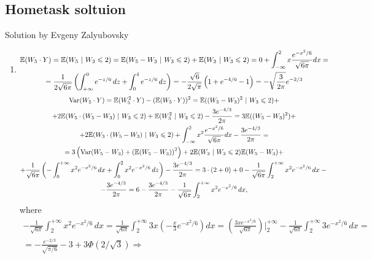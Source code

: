 \documentclass[12pt, a4paper]{article}
\begin{document}
\subsection{Hometask soltuion}

Solution by Evgeny Zalyubovsky

\begin{enumerate}
	\item
\begin{multline*}
	\mathbb{E}(W_5 \cdot Y) = \mathbb{E}(W_5\ |\ W_3 \leqslant 2) = \mathbb{E}(W_5 - W_3\ |\ W_3 \leqslant 2) + \mathbb{E}(W_3\ |\ W_3 \leqslant 2) = 0 + \int_{-\infty}^{2} x\dfrac{e^{-x^2/6}}{\sqrt{6\pi}} dx =\\= \frac{1}{2\sqrt{6\pi}} \left(\int_{+\infty}^{0} e^{-z/6}\,dz + \int_{0}^{4} e^{-z/6}\,dz\right) = -\frac{\sqrt{6}}{2\sqrt{\pi}} \left(1 + e^{-4/6} - 1\right) = -\sqrt{\frac{3}{2\pi}} e^{-2/3}
\end{multline*}
\begin{multline*}
	\operatorname{Var}(W_5 \cdot Y) = \mathbb{E}(W_5^2 \cdot Y) - (\mathbb{E}(W_5 \cdot Y))^2 = \mathbb{E}((W_5 - W_3)^2\ |\ W_3 \leqslant 2) +\\
	+ 2\mathbb{E}(W_5 \cdot (W_5 - W_3)\ |\ W_3 \leqslant 2) + \mathbb{E}(W_3^2\ |\ W_3 \leqslant 2) - \frac{3e^{-4/3}}{2\pi} =
	3\mathbb{E}((W_5 - W_3)^2) +\\
	+ 2\mathbb{E}(W_3 \cdot (W_5 - W_3)\ |\ W_3 \leqslant 2) + \int_{-\infty}^{2} x^2 \frac{e^{-x^2/6}}{\sqrt{6\pi}} dx - \frac{3e^{-4/3}}{2\pi} =\\
	= 3 \left(\operatorname{Var}(W_5 - W_3) + \left(\mathbb{E}(W_5 - W_3)\right)^2\right) + 2 \mathbb{E}(W_3\ |\ W_3 \leqslant 2) \mathbb{E}(W_5 - W_3) +\\
	+ \frac{1}{\sqrt{6\pi}} \left(-\int_{0}^{+\infty} x^2 e^{-x^2/6}\,dx + \int_{0}^{2} x^2 e^{-x^2/6}\,dz\right) - \frac{3e^{-4/3}}{2\pi} = 3 \cdot (2 + 0) + 0 - \frac{1}{\sqrt{6\pi}} \int_{2}^{+\infty} x^2 e^{-x^2/6}\,dx -{}\\
	- \frac{3e^{-4/3}}{2\pi} = 6 - \frac{3e^{-4/3}}{2\pi} - \frac{1}{\sqrt{6\pi}} \int_{2}^{+\infty} x^2 e^{-x^2/6}\,dx,
\end{multline*}
where
\begin{multline*}
-\frac{1}{\sqrt{6\pi}} \int_{2}^{+\infty} x^2 e^{-x^2/6}\,dx = \frac{1}{\sqrt{6\pi}} \int_{2}^{+\infty} 3x \left(-\frac{x}{3} e^{-x^2/6}\right) dx = \left(\frac{3xe^{-x^2/6}}{\sqrt{6\pi}}\right)\bigg|_{2}^{+\infty} - \frac{1}{\sqrt{6\pi}} \int_{2}^{+\infty} 3e^{-x^2/6}\,dx =\\= -\frac{e^{-2/3}}{\sqrt{\pi/6}} - 3 + 3\Phi\left(2/\sqrt{3}\right) \Rightarrow

\end{multline*}
\end{enumerate}
\end{document}
